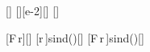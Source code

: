[\newton]
[\cm][e-2][\meter]
[\degree]

[F\,r]{\FPX*\rPX}[\newton\meter]
[r\,\sin\alpha]{\rPX*sind(\alX)}[\meter]
[F\,r\,\sin\alpha]{\FPX*\rPX*sind(\alX)}[\newton\meter]
